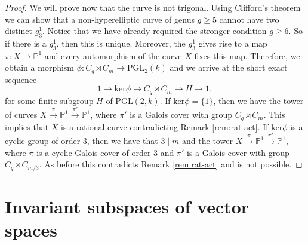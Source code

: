 \documentclass[11pt,letterpaper]{amsart}
\theoremstyle{definition}
\DeclareMathOperator\Aut{Aut}
\begin{document}
\begin{proof}
We will prove now that the curve is not trigonal. 
Using Clifford's theorem we can show  \cite[B-3 p.137]{MR770932} that a non-hyperelliptic curve of genus $g\geq 5$ cannot have two distinct $g_3^1$. Notice that we have already required the stronger condition $g \geq 6$. 
 So if there is a $g_3^1$, then this is unique. Moreover, 
 the $g_3^1$ gives rise to a map $\pi:X \rightarrow \mathbb{P}^1$ and every automorphism of the curve $X$ fixes this map. Therefore, we obtain 
 a morphism $\phi:C_q \rtimes C_m \rightarrow \mathrm{PGL}_2(k)$ and we 
arrive at the short exact sequence 
\[
1 \rightarrow \mathrm{ker} \phi  \rightarrow C_q \rtimes C_m \rightarrow H \rightarrow 1,
\]
for some finite subgroup $H$ of $\mathrm{PGL}(2,k)$. 
If $\mathrm{ker} \phi=\{1\}$,  then  we have the tower of curves
$X \stackrel{\pi}{\longrightarrow} \mathbb{P}^1 \stackrel{\pi'}{\longrightarrow} \mathbb{P}^1$, where $\pi'$ is a Galois cover with group $C_q \rtimes C_m$. This 
implies that $X$ is a rational curve contradicting 
{Remark}
 \ref{rem:rat-act}. If $\mathrm{ker}\phi$ is a cyclic group of order $3$, then we have that $3\mid m$ and the tower $X \stackrel{\pi}{\longrightarrow} \mathbb{P}^1 \stackrel{\pi'}{\longrightarrow} \mathbb{P}^1$, where $\pi$ is a cyclic Galois cover of order $3$ and $\pi'$ is a Galois cover with group $ C_q \rtimes  C_{m/3}$. As before this contradicts 
{Remark} \ref{rem:rat-act} and is not  possible. 
\end{proof}







%
%
%
%
%
\section{Invariant subspaces of vector spaces}
%
%
%
%
%
\label{sec:invariant-subspaces}
\end{document}
